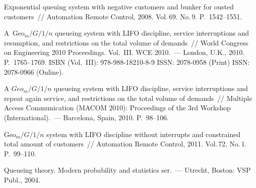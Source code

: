 \begin{multicols}{2}
{{\begin{thebibliography}{99}
Exponential queuing system with negative customers and 
bunker for ousted customers~// 
Automation Remote Control, 2008.
Vol.\,69. No.\,9. P.~1542--1551.




A~Geo$_m/G/1/n$ queueing system with LIFO discipline, service
interruptions and resumption, and restrictions on the total volume
of demands~// World Congress on Engineering 2010 Proceedings.
Vol.~III. WCE 2010.~--- London, U.K., 2010. P.~1765--1769. 
ISBN (Vol.~III):  978-988-18210-8-9
ISSN: 2078-0958 (Print)
ISSN: 2078-0966 (Online).


A $Geo_m/G/1/n$ queueing system with LIFO discipline, service
interruptions and repeat again service, and restrictions on the
total volume of demands~// Multiple Access Communication (MACOM
2010): Proceedings of the 3rd  Workshop (International).~---
Barcelona, Spain, 2010. P.~98--106.


Geo$_{m}/G/1/n$ system with LIFO discipline without 
interrupts and constrained total amount of customers~// 
Automation Remote Control, 2011.
Vol.\,72, No.\,1. P.~99--110.




\label{end\stat}

Queueing theory. Modern probability and
statistics ser.~--- Utrecht, Boston: VSP Publ., 2004.
 \end{thebibliography}
}
}


\end{multicols}